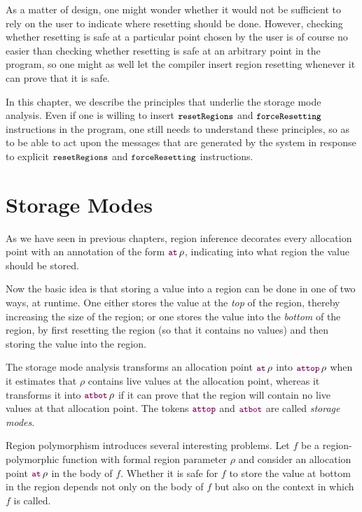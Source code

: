 \documentclass[12pt]{book}
\begin{document}
As a matter of design, one might wonder whether it would not be sufficient to
rely on the user to indicate where resetting should be done. However, checking
whether resetting is safe at a particular point chosen by the user is of course
no easier than checking whether resetting is safe at an arbitrary point in the
program, so one might as well let the compiler insert region resetting whenever
it can prove that it is safe.

In this chapter, we describe the principles that underlie the storage mode
analysis. Even if one is willing to insert $\mbox{\small\ttfamily resetRegions}$ and $\mbox{\small\ttfamily forceResetting}$ instructions
in the program, one still needs to understand these principles, so as to be able
to act upon the messages that are generated by the system in response to
explicit $\mbox{\small\ttfamily resetRegions}$ and $\mbox{\small\ttfamily forceResetting}$ instructions.

\section{Storage Modes}

As we have seen in previous chapters, region inference decorates every
%
%
%
%
allocation point with an annotation of the form $\fw{at}\,\rho$, indicating into
what region the value should be stored.

Now the basic idea is that storing a value into a region can be done in one of
two ways, at runtime. One either stores the value at the
%
%
%
{\em top\/} of the region, thereby increasing the size of the region; or one
stores the value into the
%
%
%
{\em bottom\/} of the region, by first resetting the region (so that it contains
no values) and then storing the value into the region.

The storage mode analysis transforms an allocation point $\fw{at}\,\rho$
into
%
%
%
$\fw{attop}\,\rho$ when it estimates that $\rho$ contains live values at
the allocation point, whereas it transforms it into
%
%
%
$\fw{atbot}\,\rho$ if it can prove that the region will contain no live values
at that allocation point. The tokens $\fw{attop}$ and $\fw{atbot}$ are called
%
%
%
{\em storage modes}.

%
%
Region polymorphism introduces several interesting problems. Let $f$ be a
region-polymorphic function with formal region parameter $\rho$ and consider an
allocation point $\fw{at}\,\rho$ in the body of $f$.  Whether it is safe for $f$
to store the value at bottom in the region depends not only on the body of $f$
but also on the context in which $f$ is called.
\end{document}
